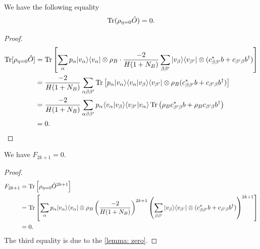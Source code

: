 \documentclass[../../note.tex]{subfiles}
\begin{document}
\begin{lemma}
\label{lemma: zero}
    We have the following equality
    \begin{align}
        \operatorname{Tr}(\rho_{\eta = 0} \hat{O}) = 0.
    \end{align}
\end{lemma}
\begin{proof}
    \begin{align}
        \operatorname{Tr}[\rho_{\eta = 0} \hat{O}]
        &= \operatorname{Tr}\left[\sum_{\alpha} p_{\alpha} \vert v_{\alpha} \rangle \langle v_{\alpha} \vert \otimes \rho_B \cdot \frac{-2}{H(1+N_B)} \sum_{\beta \beta^{\prime}} \vert v_{\beta} \rangle \langle v_{\beta^\prime} \vert \otimes (c_{\beta \beta^\prime}^\ast b + c_{\beta^\prime \beta} b^\dagger)\right] \\
        &= \frac{-2}{H(1+N_B)} \sum_{\alpha \beta \beta^\prime} \operatorname{Tr}\left[p_{\alpha} \vert v_{\alpha} \rangle \langle v_{\alpha} \vert v_{\beta} \rangle \langle v_{\beta^\prime} \vert \otimes \rho_B (c^\ast_{\beta \beta^\prime} b + c_{\beta^\prime \beta} b^\dagger)\right] \\
        &= \frac{-2}{H(1+N_B)} \sum_{\alpha \beta \beta^\prime} p_{\alpha} \langle v_{\alpha} \vert v_{\beta} \rangle \langle v_{\beta^\prime} \vert v_{\alpha} \rangle \operatorname{Tr}\left(\rho_B c_{\beta^\prime \beta}^\ast b + \rho_{B} c_{\beta^\prime \beta} b^\dagger \right) \\
        &= 0.
    \end{align}
\end{proof}

\begin{lemma}
We have $F_{2k+1} = 0$.
\end{lemma}
\begin{proof}
    \begin{align}
        F_{2k+1} 
        &= \operatorname{Tr} \left[ \rho_{\eta = 0} \hat{O}^{2k+1}\right] \\
        &= \operatorname{Tr}\left[\sum_{\alpha} p_{\alpha} \vert v_{\alpha} \rangle \langle v_{\alpha} \vert \otimes \rho_B \left(\frac{-2}{H(1+N_B)}\right)^{2k+1} \left(\sum_{\beta \beta^\prime} \vert v_{\beta} \rangle \langle v_{\beta^\prime} \vert \otimes (c^\ast_{\beta \beta^\prime} b + c_{\beta^\prime \beta} b^\dagger ) \right)^{2k+1}\right] \\
        &= 0.
    \end{align}
    The third equality is due to the \ref{lemma: zero}.
\end{proof}
\end{document}
